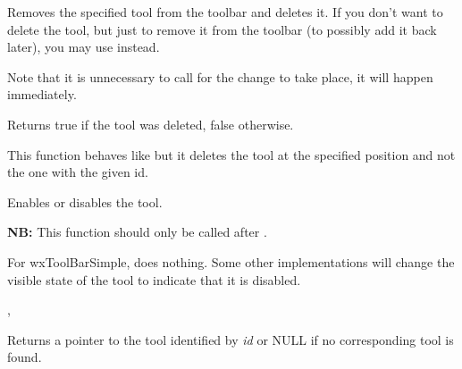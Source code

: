 Removes the specified tool from the toolbar and deletes it. If you don't want
to delete the tool, but just to remove it from the toolbar (to possibly add it
back later), you may use  instead.

Note that it is unnecessary to call  for the
change to take place, it will happen immediately.

Returns true if the tool was deleted, false otherwise.



\label{wxtoolbardeletetoolbypos}


This function behaves like  but it
deletes the tool at the specified position and not the one with the given id.

\label{wxtoolbarenabletool}


Enables or disables the tool.




{\bf NB:} This function should only be called after 
.


For wxToolBarSimple, does nothing. Some other implementations
will change the visible state of the tool to indicate that it is disabled.


,\rtfsp
{}

\label{wxtoolbarfindbyid}


Returns a pointer to the tool identified by {\it id} or
NULL if no corresponding tool is found.

\label{wxtoolbarfindcontrol}

